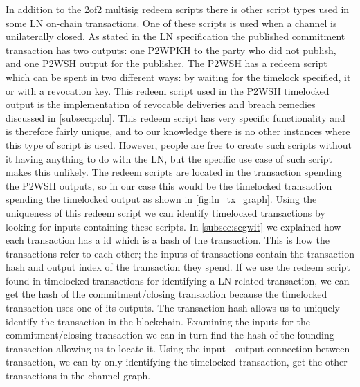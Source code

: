 In addition to the 2of2 multisig redeem scripts there is other script types used in some LN on-chain transactions. One of these scripts is used when a channel is unilaterally closed. As stated in the LN specification \cite{bolt3} the published commitment transaction has two outputs: one P2WPKH to the party who did not publish, and one P2WSH output for the publisher.
The P2WSH has a redeem script which can be spent in two different ways: by waiting for the timelock specified, it or with a revocation key. This redeem script used in the P2WSH timelocked output is the implementation of revocable deliveries and breach remedies discussed in \cref{subsec:pcln}.
This redeem script has very specific functionality and is therefore fairly unique, and to our knowledge there is no other instances where this type of script is used. However, people are free to create such scripts without it having anything to do with the LN, but the specific use case of such script makes this unlikely. The redeem scripts are located in the transaction spending the P2WSH outputs, so in our case this would be the timelocked transaction spending the timelocked output as shown in \cref{fig:ln_tx_graph}. Using the uniqueness of this redeem script we can identify timelocked transactions by looking for inputs containing these scripts. 
In \cref{subsec:segwit} we explained how each transaction has a id which is a hash of the transaction. This is how the transactions refer to each other; the inputs of transactions contain the transaction hash and output index of the transaction they spend. If we use the redeem script found in timelocked transactions for identifying a LN related transaction, we can get the hash of the commitment/closing transaction because the timelocked transaction uses one of its outputs. The transaction hash allows us to uniquely identify the transaction in the blockchain. Examining the inputs for the commitment/closing transaction we can in turn find the hash of the founding transaction allowing us to locate it. Using the input - output connection between transaction, we can by only identifying the timelocked transaction, get the other transactions in the channel graph. 
\\

